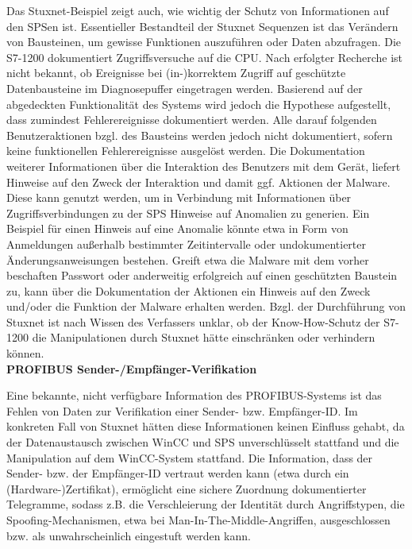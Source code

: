 Das Stuxnet-Beispiel zeigt auch, wie wichtig der Schutz von Informationen auf den SPSen ist. Essentieller Bestandteil der Stuxnet Sequenzen ist das Verändern von Bausteinen, um gewisse Funktionen auszuführen oder Daten abzufragen. Die S7-1200 dokumentiert Zugriffsversuche auf die CPU. Nach erfolgter Recherche ist nicht bekannt, ob Ereignisse bei (in-)korrektem Zugriff auf geschützte Datenbausteine im Diagnosepuffer eingetragen werden. Basierend auf der abgedeckten Funktionalität des Systems wird jedoch die Hypothese aufgestellt, dass zumindest Fehlerereignisse dokumentiert werden. Alle darauf folgenden Benutzeraktionen bzgl. des Bausteins werden jedoch nicht dokumentiert, sofern keine funktionellen Fehlerereignisse ausgelöst werden. 
Die Dokumentation weiterer Informationen über die Interaktion des Benutzers mit dem Gerät, liefert Hinweise auf den Zweck der Interaktion und damit ggf. Aktionen der Malware. Diese kann genutzt werden, um in Verbindung mit Informationen über Zugriffsverbindungen zu der SPS Hinweise auf Anomalien zu generien. Ein Beispiel für einen Hinweis auf eine Anomalie könnte etwa in Form von Anmeldungen außerhalb bestimmter Zeitintervalle oder undokumentierter Änderungsanweisungen bestehen. 
Greift etwa die Malware mit dem vorher beschaften Passwort oder anderweitig erfolgreich auf einen geschützten Baustein zu, kann über die Dokumentation der Aktionen ein Hinweis auf den Zweck und/oder die Funktion der Malware erhalten werden. Bzgl. der Durchführung von Stuxnet ist nach Wissen des Verfassers unklar, ob der Know-How-Schutz der S7-1200 die Manipulationen durch Stuxnet hätte einschränken oder verhindern können.\\

\textbf{PROFIBUS Sender-/Empfänger-Verifikation}

Eine bekannte, nicht verfügbare Information des PROFIBUS-Systems ist das Fehlen von Daten zur Verifikation einer Sender- bzw. Empfänger-ID. Im konkreten Fall von Stuxnet hätten diese Informationen keinen Einfluss gehabt, da der Datenaustausch zwischen WinCC und SPS unverschlüsselt stattfand und die Manipulation auf dem WinCC-System stattfand. Die Information, dass der Sender- bzw. der Empfänger-ID vertraut werden kann (etwa durch ein (Hardware-)Zertifikat), ermöglicht eine sichere Zuordnung dokumentierter Telegramme, sodass z.B. die Verschleierung der Identität durch Angriffstypen, die Spoofing-Mechanismen, etwa bei Man-In-The-Middle-Angriffen, ausgeschlossen bzw. als unwahrscheinlich eingestuft werden kann.

